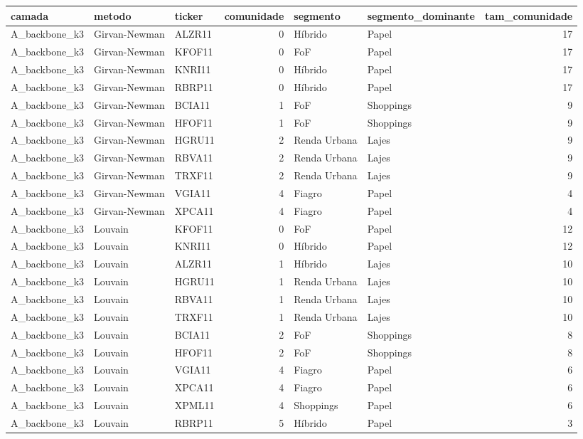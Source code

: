 \begin{tabular}{lllrllr}
\toprule
camada & metodo & ticker & comunidade & segmento & segmento\_dominante & tam\_comunidade \\
\midrule
A\_backbone\_k3 & Girvan-Newman & ALZR11 & 0 & Híbrido & Papel & 17 \\
A\_backbone\_k3 & Girvan-Newman & KFOF11 & 0 & FoF & Papel & 17 \\
A\_backbone\_k3 & Girvan-Newman & KNRI11 & 0 & Híbrido & Papel & 17 \\
A\_backbone\_k3 & Girvan-Newman & RBRP11 & 0 & Híbrido & Papel & 17 \\
A\_backbone\_k3 & Girvan-Newman & BCIA11 & 1 & FoF & Shoppings & 9 \\
A\_backbone\_k3 & Girvan-Newman & HFOF11 & 1 & FoF & Shoppings & 9 \\
A\_backbone\_k3 & Girvan-Newman & HGRU11 & 2 & Renda Urbana & Lajes & 9 \\
A\_backbone\_k3 & Girvan-Newman & RBVA11 & 2 & Renda Urbana & Lajes & 9 \\
A\_backbone\_k3 & Girvan-Newman & TRXF11 & 2 & Renda Urbana & Lajes & 9 \\
A\_backbone\_k3 & Girvan-Newman & VGIA11 & 4 & Fiagro & Papel & 4 \\
A\_backbone\_k3 & Girvan-Newman & XPCA11 & 4 & Fiagro & Papel & 4 \\
A\_backbone\_k3 & Louvain & KFOF11 & 0 & FoF & Papel & 12 \\
A\_backbone\_k3 & Louvain & KNRI11 & 0 & Híbrido & Papel & 12 \\
A\_backbone\_k3 & Louvain & ALZR11 & 1 & Híbrido & Lajes & 10 \\
A\_backbone\_k3 & Louvain & HGRU11 & 1 & Renda Urbana & Lajes & 10 \\
A\_backbone\_k3 & Louvain & RBVA11 & 1 & Renda Urbana & Lajes & 10 \\
A\_backbone\_k3 & Louvain & TRXF11 & 1 & Renda Urbana & Lajes & 10 \\
A\_backbone\_k3 & Louvain & BCIA11 & 2 & FoF & Shoppings & 8 \\
A\_backbone\_k3 & Louvain & HFOF11 & 2 & FoF & Shoppings & 8 \\
A\_backbone\_k3 & Louvain & VGIA11 & 4 & Fiagro & Papel & 6 \\
A\_backbone\_k3 & Louvain & XPCA11 & 4 & Fiagro & Papel & 6 \\
A\_backbone\_k3 & Louvain & XPML11 & 4 & Shoppings & Papel & 6 \\
A\_backbone\_k3 & Louvain & RBRP11 & 5 & Híbrido & Papel & 3 \\

\end{tabular}
